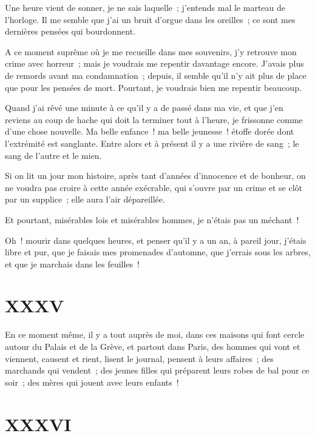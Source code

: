 \documentclass[french,twoside]{book} %
\begin{document}
\noindent Une heure vient de sonner, je ne sais laquelle ; j’entends mal le marteau de l’horloge. Il me semble que j’ai un bruit d’orgue dans les oreilles ; ce sont mes dernières pensées qui bourdonnent.\par
A ce moment suprême où je me recueille dans mes souvenirs, j’y retrouve mon crime avec horreur ; mais je voudrais me repentir davantage encore. J’avais plus de remords avant ma condamnation ; depuis, il semble qu’il n’y ait plus de place que pour les pensées de mort. Pourtant, je voudrais bien me repentir beaucoup.\par
Quand j’ai rêvé une minute à ce qu’il y a de passé dans ma vie, et que j’en reviens au coup de hache qui doit la terminer tout à l’heure, je frissonne comme d’une chose nouvelle. Ma belle enfance ! ma belle jeunesse ! étoffe dorée dont l’extrémité est sanglante. Entre alors et à présent il y a une rivière de sang ; le sang de l’autre et le mien.\par
Si on lit un jour mon histoire, après tant d’années  d’innocence et de bonheur, on ne voudra pas croire à cette année exécrable, qui s’ouvre par un crime et se clôt par un supplice ; elle aura l’air dépareillée.\par
Et pourtant, misérables lois et misérables hommes, je n’étais pas un méchant !\par
Oh ! mourir dans quelques heures, et penser qu’il y a un an, à pareil jour, j’étais libre et pur, que je faisais mes promenades d’automne, que j’errais sous les arbres, et que je marchais dans les feuilles !
 \section[{XXXV}]{XXXV}
\label{ch35}\renewcommand{\leftmark}{XXXV}

\noindent En ce moment même, il y a tout auprès de moi, dans ces maisons qui font cercle autour du Palais et de la Grève, et partout dans Paris, des hommes qui vont et viennent, causent et rient, lisent le journal, pensent à leurs affaires ; des marchands qui vendent ; des jeunes filles qui préparent leurs robes de bal pour ce soir ; des mères qui jouent avec leurs enfants !
 \section[{XXXVI}]{XXXVI}
\label{ch36}\renewcommand{\leftmark}{XXXVI}
\end{document}
